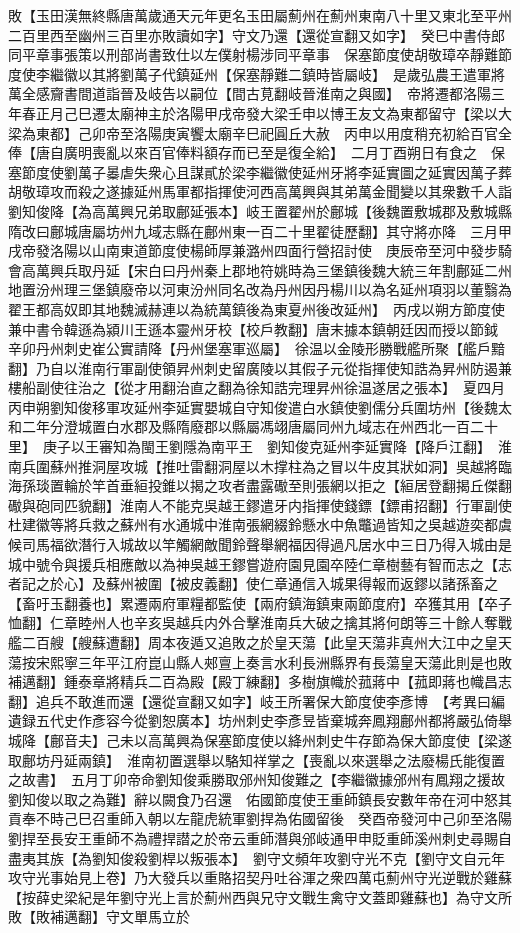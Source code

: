 敗【玉田漢無終縣唐萬歲通天元年更名玉田屬薊州在薊州東南八十里又東北至平州二百里西至幽州三百里亦敗讀如字】守文乃還【還從宣翻又如字】　癸巳中書侍郎同平章事張策以刑部尚書致仕以左僕射楊涉同平章事　保塞節度使胡敬璋卒靜難節度使李繼徽以其將劉萬子代鎮延州【保塞靜難二鎮時皆屬岐】　是歲弘農王遣軍將萬全感齎書間道詣晉及岐告以嗣位【間古莧翻岐晉淮南之與國】　帝將遷都洛陽三年春正月己巳遷太廟神主於洛陽甲戌帝發大梁壬申以博王友文為東都留守【梁以大梁為東都】己卯帝至洛陽庚寅饗太廟辛巳祀圓丘大赦　丙申以用度稍充初給百官全俸【唐自廣明喪亂以來百官俸料額存而已至是復全給】　二月丁酉朔日有食之　保塞節度使劉萬子㬥虐失衆心且謀貳於梁李繼徽使延州牙將李延實圖之延實因萬子葬胡敬璋攻而殺之遂據延州馬軍都指揮使河西高萬興與其弟萬金聞變以其衆數千人詣劉知俊降【為高萬興兄弟取鄜延張本】岐王置翟州於鄜城【後魏置敷城郡及敷城縣隋改曰鄜城唐屬坊州九域志縣在鄜州東一百二十里翟徒歷翻】其守將亦降　三月甲戌帝發洛陽以山南東道節度使楊師厚兼潞州四面行營招討使　庚辰帝至河中發步騎會高萬興兵取丹延【宋白曰丹州秦上郡地符姚時為三堡鎮後魏大統三年割鄜延二州地置汾州理三堡鎮廢帝以河東汾州同名改為丹州因丹楊川以為名延州項羽以董翳為翟王都高奴即其地魏滅赫連以為統萬鎮後為東夏州後改延州】　丙戌以朔方節度使兼中書令韓遜為潁川王遜本靈州牙校【校戶教翻】唐末據本鎮朝廷因而授以節鉞　辛卯丹州刺史崔公實請降【丹州堡塞軍巡屬】　徐温以金陵形勝戰艦所聚【艦戶黯翻】乃自以淮南行軍副使領昇州刺史留廣陵以其假子元從指揮使知誥為昇州防遏兼樓船副使往治之【從才用翻治直之翻為徐知誥完理昇州徐温遂居之張本】　夏四月丙申朔劉知俊移軍攻延州李延實嬰城自守知俊遣白水鎮使劉儒分兵圍坊州【後魏太和二年分澄城置白水郡及縣隋廢郡以縣屬馮翊唐屬同州九域志在州西北一百二十里】　庚子以王審知為閩王劉隱為南平王　劉知俊克延州李延實降【降戶江翻】　淮南兵圍蘇州推洞屋攻城【推吐雷翻洞屋以木撑柱為之冒以牛皮其狀如洞】吳越將臨海孫琰置輪於竿首垂絙投錐以揭之攻者盡露礮至則張網以拒之【絙居登翻揭丘傑翻礮與砲同匹貌翻】淮南人不能克吳越王鏐遣牙内指揮使錢鏢【鏢甫招翻】行軍副使杜建徽等將兵救之蘇州有水通城中淮南張網綴鈴懸水中魚鼈過皆知之吳越遊奕都虞候司馬福欲潛行入城故以竿觸網敵聞鈴聲舉網福因得過凡居水中三日乃得入城由是城中號令與援兵相應敵以為神吳越王鏐嘗遊府園見園卒陸仁章樹藝有智而志之【志者記之於心】及蘇州被圍【被皮義翻】使仁章通信入城果得報而返鏐以諸孫畜之【畜吁玉翻養也】累遷兩府軍糧都監使【兩府鎮海鎮東兩節度府】卒獲其用【卒子恤翻】仁章睦州人也辛亥吳越兵内外合擊淮南兵大破之擒其將何朗等三十餘人奪戰艦二百艘【艘蘇遭翻】周本夜遁又追敗之於皇天蕩【此皇天蕩非真州大江中之皇天蕩按宋熙寧三年平江府崑山縣人郟亶上奏言水利長洲縣界有長蕩皇天蕩此則是也敗補邁翻】鍾泰章將精兵二百為殿【殿丁練翻】多樹旗幟於菰蔣中【菰即蔣也幟昌志翻】追兵不敢進而還【還從宣翻又如字】岐王所署保大節度使李彥博　【考異曰編遺録五代史作彥容今從劉恕廣本】坊州刺史李彥昱皆棄城奔鳳翔鄜州都將嚴弘倚舉城降【鄜音夫】己未以高萬興為保塞節度使以絳州刺史牛存節為保大節度使【梁遂取鄜坊丹延兩鎮】　淮南初置選舉以駱知祥掌之【喪亂以來選舉之法廢楊氏能復置之故書】　五月丁卯帝命劉知俊乘勝取邠州知俊難之【李繼徽據邠州有鳳翔之援故劉知俊以取之為難】辭以闕食乃召還　佑國節度使王重師鎮長安數年帝在河中怒其貢奉不時己巳召重師入朝以左龍虎統軍劉捍為佑國留後　癸酉帝發河中己卯至洛陽劉捍至長安王重師不為禮捍譛之於帝云重師潛與邠岐通甲申貶重師溪州刺史尋賜自盡夷其族【為劉知俊殺劉桿以叛張本】　劉守文頻年攻劉守光不克【劉守文自元年攻守光事始見上卷】乃大發兵以重賂招契丹吐谷渾之衆四萬屯薊州守光逆戰於雞蘇【按薛史梁紀是年劉守光上言於薊州西與兄守文戰生禽守文蓋即雞蘇也】為守文所敗【敗補邁翻】守文單馬立於